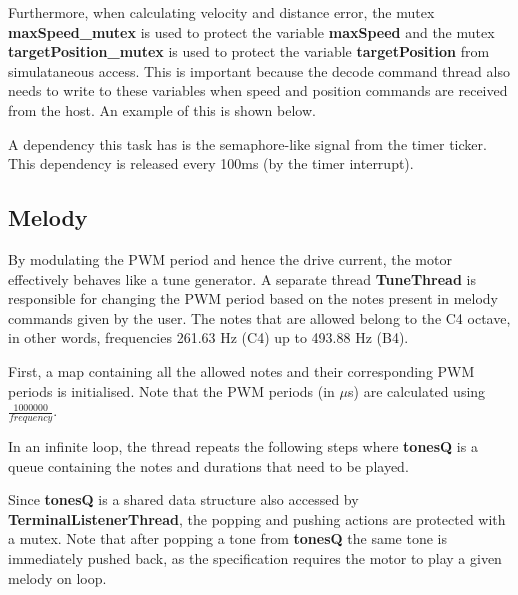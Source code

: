 \documentclass{article}
\begin{document}
\bigskip

\bigskip

\noindent
Furthermore, when calculating velocity and distance error, the mutex \textbf{maxSpeed\_mutex }is used to protect the variable \textbf{maxSpeed} and the mutex \textbf{targetPosition\_mutex} is used to protect the variable \textbf{targetPosition} from simulataneous access. This is important because the decode command thread also needs to write to these variables when speed and position commands are received from the host. An example of this is shown below.

\bigskip

\bigskip

\noindent
A dependency this task has is the semaphore-like signal from the timer ticker. This dependency is released every 100ms (by the timer interrupt).

\subsection{Melody}

\noindent
By modulating the PWM period and hence the drive current, the motor effectively behaves like a tune generator. A separate thread \textbf{TuneThread} is responsible for changing the PWM period based on the notes present in melody commands given by the user. The notes that are allowed belong to the C4 octave, in other words, frequencies 261.63 Hz (C4) up to 493.88 Hz (B4).

\bigskip

\noindent
First, a map containing all the allowed notes and their corresponding PWM periods is initialised. Note that the PWM periods (in $\mu$s) are calculated using $\frac{1000000}{frequency}$.

\bigskip



\bigskip

\noindent
In an infinite loop, the thread repeats the following steps where \textbf{tonesQ} is a queue containing the notes and durations that need to be played.

\bigskip



\bigskip

\noindent
Since \textbf{tonesQ} is a shared data structure also accessed by \textbf{TerminalListenerThread}, the popping and pushing actions are protected with a mutex. Note that after popping a tone from \textbf{tonesQ} the same tone is immediately pushed back, as the specification requires the motor to play a given melody on loop.
\end{document}
